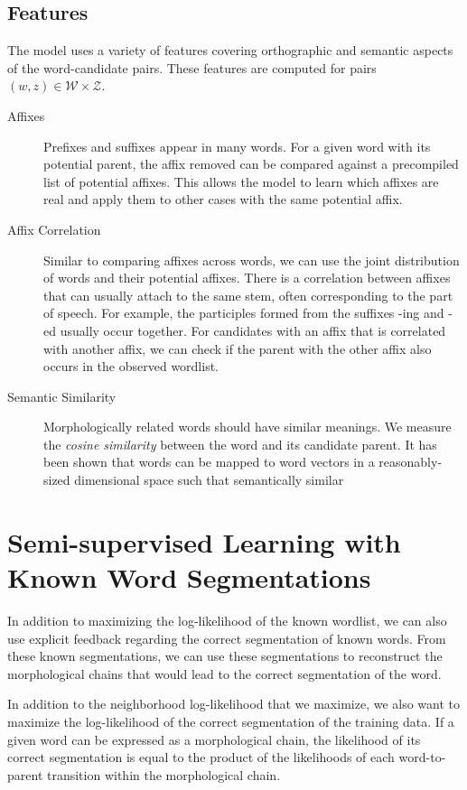 \documentclass[11pt,twocolumn]{article}
\begin{document}
\subsection{Features}

The model uses a variety of features covering orthographic and semantic aspects of the word-candidate pairs. These features are computed for pairs $(w,z) \in \mathcal W \times \mathcal Z$.

\begin{description}
    \item[Affixes] Prefixes and suffixes appear in many words. For a given word with its potential parent, the affix removed can be compared against a precompiled list of potential affixes. This allows the model to learn which affixes are real and apply them to other cases with the same potential affix.
    \item[Affix Correlation] Similar to comparing affixes across words, we can use the joint distribution of words and their potential affixes. There is a correlation between affixes that can usually attach to the same stem, often corresponding to the part of speech. For example, the participles formed from the suffixes -ing and -ed usually occur together. For candidates with an affix that is correlated with another affix, we can check if the parent with the other affix also occurs in the observed wordlist.
    \item[Semantic Similarity] Morphologically related words should have similar meanings. We measure the \emph{cosine similarity} between the word and its candidate parent. %
        It has been shown that words can be mapped to word vectors in a reasonably-sized dimensional space such that semantically similar 
\end{description}

\section{Semi-supervised Learning with Known Word Segmentations}
In addition to maximizing the log-likelihood of the known wordlist,
we can also use explicit feedback regarding the correct segmentation of known words.
From these known segmentations, we can use these segmentations to reconstruct
the morphological chains that would lead to the correct segmentation of the word.

In addition to the neighborhood log-likelihood that we maximize,
we also want to maximize the log-likelihood of the correct segmentation of the training data.
If a given word can be expressed as a morphological chain, the likelihood of its correct segmentation
is equal to the product of the likelihoods of each word-to-parent transition within the morphological chain.
\end{document}
